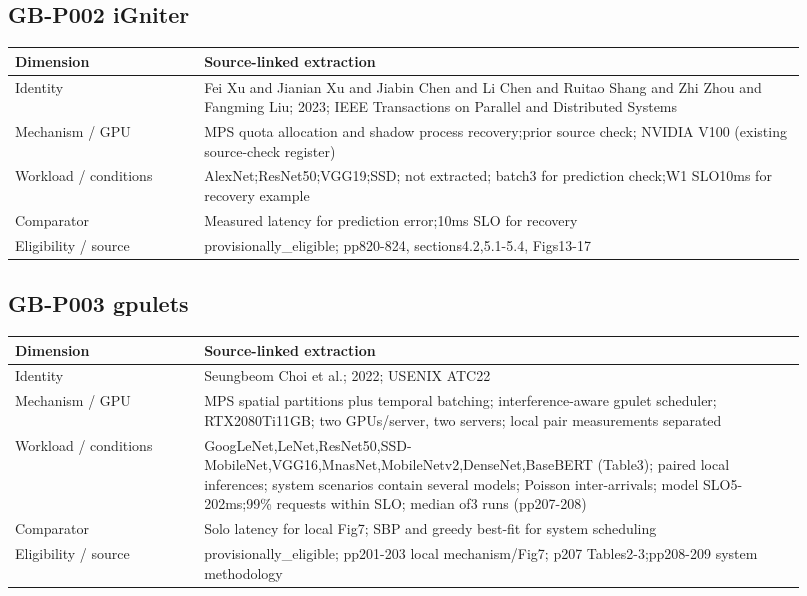 \documentclass[12pt,a4paper]{article}
\begin{document}
\subsection*{GB-P002 iGniter}
\cite{GB-P002}

{\small\begin{longtable}{>{\raggedright\arraybackslash}p{0.22\linewidth}>{\raggedright\arraybackslash}p{0.7\linewidth}}
\toprule
Dimension & Source-linked extraction\\\midrule
\endhead
Identity & Fei Xu and Jianian Xu and Jiabin Chen and Li Chen and Ruitao Shang and Zhi Zhou and Fangming Liu; 2023; IEEE Transactions on Parallel and Distributed Systems\\
Mechanism /\allowbreak{} GPU & MPS quota allocation and shadow process recovery;prior source check; NVIDIA V100 (existing source-check register)\\
Workload /\allowbreak{} conditions & AlexNet;ResNet50;VGG19;SSD; not extracted; batch3 for prediction check;W1 SLO10ms for recovery example\\
Comparator & Measured latency for prediction error;10ms SLO for recovery\\
Eligibility /\allowbreak{} source & provisionally\_\allowbreak{}eligible; pp820-824, sections4.2,5.1-5.4, Figs13-17\\
\bottomrule
\end{longtable}}

\subsection*{GB-P003 gpulets}
\cite{GB-P003}

{\small\begin{longtable}{>{\raggedright\arraybackslash}p{0.22\linewidth}>{\raggedright\arraybackslash}p{0.7\linewidth}}
\toprule
Dimension & Source-linked extraction\\\midrule
\endhead
Identity & Seungbeom Choi et al.; 2022; USENIX ATC22\\
Mechanism /\allowbreak{} GPU & MPS spatial partitions plus temporal batching; interference-aware gpulet scheduler; RTX2080Ti11GB; two GPUs/\allowbreak{}server, two servers; local pair measurements separated\\
Workload /\allowbreak{} conditions & GoogLeNet,LeNet,ResNet50,SSD-MobileNet,VGG16,MnasNet,MobileNetv2,DenseNet,BaseBERT (Table3); paired local inferences; system scenarios contain several models; Poisson inter-arrivals; model SLO5-202ms;99\% requests within SLO; median of3 runs (pp207-208)\\
Comparator & Solo latency for local Fig7; SBP and greedy best-fit for system scheduling\\
Eligibility /\allowbreak{} source & provisionally\_\allowbreak{}eligible; pp201-203 local mechanism/\allowbreak{}Fig7; p207 Tables2-3;pp208-209 system methodology\\
\bottomrule
\end{longtable}}
\end{document}
